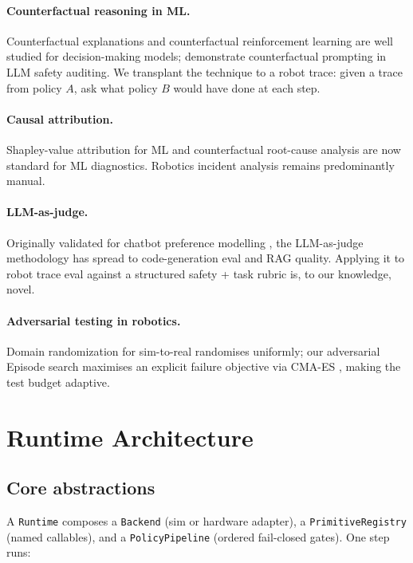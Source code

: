\documentclass[11pt]{article}
\begin{document}
\paragraph{Counterfactual reasoning in ML.} Counterfactual
explanations \citep{wachter2017counterfactual} and counterfactual
reinforcement learning \citep{buesing2018woulda} are well studied
for decision-making models; \citet{anthropic2024sleeper}
demonstrate counterfactual prompting in LLM safety auditing. We
transplant the technique to a robot trace: given a trace from
policy $A$, ask what policy $B$ would have done at each step.

\paragraph{Causal attribution.} Shapley-value attribution for ML
\citep{lundberg2017shap} and counterfactual root-cause analysis
\citep{ji2023rca} are now standard for ML diagnostics. Robotics
incident analysis remains predominantly manual.

\paragraph{LLM-as-judge.} Originally validated for chatbot
preference modelling \citep{zheng2023judging,gu2024llmjudge}, the
LLM-as-judge methodology has spread to code-generation eval and
RAG quality. Applying it to robot trace eval against a structured
safety + task rubric is, to our knowledge, novel.

\paragraph{Adversarial testing in robotics.} Domain randomization
for sim-to-real \citep{tobin2017dr} randomises uniformly; our
adversarial Episode search maximises an explicit failure objective
via CMA-ES \citep{hansen2003cmaes}, making the test budget
adaptive.

\section{Runtime Architecture}

\subsection{Core abstractions}

A \texttt{Runtime} composes a \texttt{Backend} (sim or hardware
adapter), a \texttt{PrimitiveRegistry} (named callables), and a
\texttt{PolicyPipeline} (ordered fail-closed gates). One step
runs:
\end{document}
